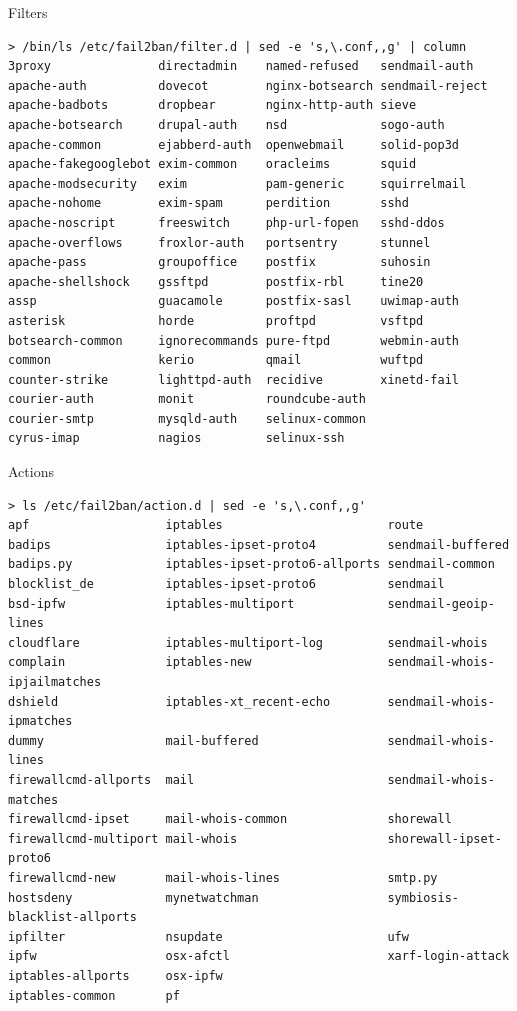 \documentclass[]{beamer}
\begin{document}
\begin{frame}[fragile]{Filters}

\begin{Verbatim}[fontsize=\scriptsize]
> /bin/ls /etc/fail2ban/filter.d | sed -e 's,\.conf,,g' | column
3proxy               directadmin    named-refused   sendmail-auth
apache-auth          dovecot        nginx-botsearch sendmail-reject
apache-badbots       dropbear       nginx-http-auth sieve
apache-botsearch     drupal-auth    nsd             sogo-auth
apache-common        ejabberd-auth  openwebmail     solid-pop3d
apache-fakegooglebot exim-common    oracleims       squid
apache-modsecurity   exim           pam-generic     squirrelmail
apache-nohome        exim-spam      perdition       sshd
apache-noscript      freeswitch     php-url-fopen   sshd-ddos
apache-overflows     froxlor-auth   portsentry      stunnel
apache-pass          groupoffice    postfix         suhosin
apache-shellshock    gssftpd        postfix-rbl     tine20
assp                 guacamole      postfix-sasl    uwimap-auth
asterisk             horde          proftpd         vsftpd
botsearch-common     ignorecommands pure-ftpd       webmin-auth
common               kerio          qmail           wuftpd
counter-strike       lighttpd-auth  recidive        xinetd-fail
courier-auth         monit          roundcube-auth
courier-smtp         mysqld-auth    selinux-common
cyrus-imap           nagios         selinux-ssh
\end{Verbatim}
\end{frame}


\begin{frame}[fragile]{Actions}

\begin{Verbatim}[fontsize=\scriptsize]
> ls /etc/fail2ban/action.d | sed -e 's,\.conf,,g'
apf                   iptables                       route
badips                iptables-ipset-proto4          sendmail-buffered
badips.py             iptables-ipset-proto6-allports sendmail-common
blocklist_de          iptables-ipset-proto6          sendmail
bsd-ipfw              iptables-multiport             sendmail-geoip-lines
cloudflare            iptables-multiport-log         sendmail-whois
complain              iptables-new                   sendmail-whois-ipjailmatches
dshield               iptables-xt_recent-echo        sendmail-whois-ipmatches
dummy                 mail-buffered                  sendmail-whois-lines
firewallcmd-allports  mail                           sendmail-whois-matches
firewallcmd-ipset     mail-whois-common              shorewall
firewallcmd-multiport mail-whois                     shorewall-ipset-proto6
firewallcmd-new       mail-whois-lines               smtp.py
hostsdeny             mynetwatchman                  symbiosis-blacklist-allports
ipfilter              nsupdate                       ufw
ipfw                  osx-afctl                      xarf-login-attack
iptables-allports     osx-ipfw
iptables-common       pf
\end{Verbatim}
\end{frame}
\end{document}
